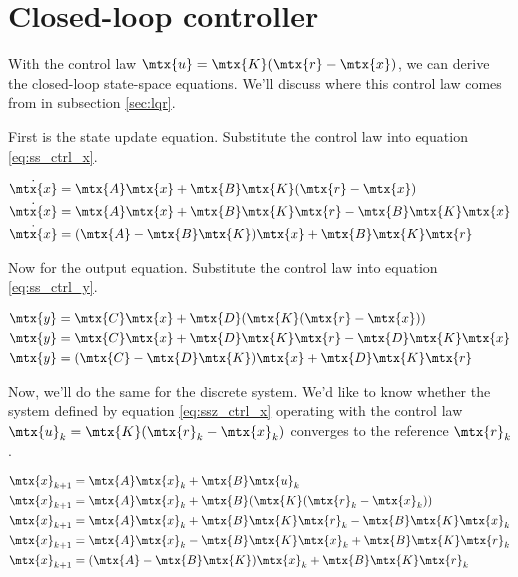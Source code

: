 \section{Closed-loop controller}

With the \gls{control law} $\mtx{u} = \mtx{K}(\mtx{r} - \mtx{x})$, we can derive
the closed-loop state-space equations. We'll discuss where this
\gls{control law} comes from in subsection \ref{sec:lqr}.

First is the \gls{state} update equation. Substitute the \gls{control law} into
equation \eqref{eq:ss_ctrl_x}.

\begin{align}
  \dot{\mtx{x}} &= \mtx{A}\mtx{x} + \mtx{B}\mtx{K}(\mtx{r} - \mtx{x}) \nonumber
    \\
  \dot{\mtx{x}} &= \mtx{A}\mtx{x} + \mtx{B}\mtx{K}\mtx{r} -
    \mtx{B}\mtx{K}\mtx{x} \nonumber \\
  \dot{\mtx{x}} &= (\mtx{A} - \mtx{B}\mtx{K})\mtx{x} + \mtx{B}\mtx{K}\mtx{r}
\end{align}

Now for the \gls{output} equation. Substitute the \gls{control law} into
equation \eqref{eq:ss_ctrl_y}.

\begin{align}
  \mtx{y} &= \mtx{C}\mtx{x} + \mtx{D}(\mtx{K}(\mtx{r} - \mtx{x})) \nonumber \\
  \mtx{y} &= \mtx{C}\mtx{x} + \mtx{D}\mtx{K}\mtx{r} - \mtx{D}\mtx{K}\mtx{x}
    \nonumber \\
  \mtx{y} &= (\mtx{C} - \mtx{D}\mtx{K})\mtx{x} + \mtx{D}\mtx{K}\mtx{r}
\end{align}

Now, we'll do the same for the discrete \gls{system}. We'd like to know whether
the \gls{system} defined by equation \eqref{eq:ssz_ctrl_x} operating with the
\gls{control law} $\mtx{u}_k = \mtx{K}(\mtx{r}_k - \mtx{x}_k)$ converges to the
\gls{reference} $\mtx{r}_k$.

\begin{align*}
  \mtx{x}_{k+1} &= \mtx{A}\mtx{x}_k + \mtx{B}\mtx{u}_k \\
  \mtx{x}_{k+1} &= \mtx{A}\mtx{x}_k + \mtx{B}(\mtx{K}(\mtx{r}_k - \mtx{x}_k)) \\
  \mtx{x}_{k+1} &= \mtx{A}\mtx{x}_k + \mtx{B}\mtx{K}\mtx{r}_k -
    \mtx{B}\mtx{K}\mtx{x}_k \\
  \mtx{x}_{k+1} &= \mtx{A}\mtx{x}_k - \mtx{B}\mtx{K}\mtx{x}_k +
    \mtx{B}\mtx{K}\mtx{r}_k \\
  \mtx{x}_{k+1} &= (\mtx{A} - \mtx{B}\mtx{K})\mtx{x}_k + \mtx{B}\mtx{K}\mtx{r}_k
\end{align*}


